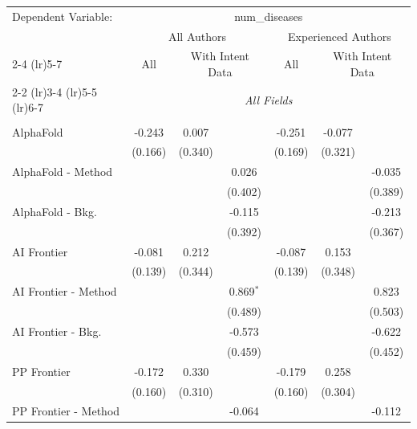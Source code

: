 \begingroup
\centering
\begin{tabular}{lcccccc}
   \tabularnewline \midrule \midrule
   Dependent Variable: & \multicolumn{6}{c}{num\_diseases}\\
 & \multicolumn{3}{c}{All Authors} & \multicolumn{3}{c}{Experienced Authors} \\
\cmidrule(lr){2-4} \cmidrule(lr){5-7}
 & \multicolumn{1}{c}{All} & \multicolumn{2}{c}{With Intent Data} & \multicolumn{1}{c}{All} & \multicolumn{2}{c}{With Intent Data} \\
\cmidrule(lr){2-2} \cmidrule(lr){3-4} \cmidrule(lr){5-5} \cmidrule(lr){6-7}
 & \multicolumn{6}{c}{\textit{All Fields}} \\ \\
   AlphaFold            & -0.243  & 0.007   &             & -0.251  & -0.077  &   \\   
                        & (0.166) & (0.340) &             & (0.169) & (0.321) &   \\   
   AlphaFold - Method   &         &         & 0.026       &         &         & -0.035\\   
                        &         &         & (0.402)     &         &         & (0.389)\\   
   AlphaFold - Bkg.     &         &         & -0.115      &         &         & -0.213\\   
                        &         &         & (0.392)     &         &         & (0.367)\\   
   AI Frontier          & -0.081  & 0.212   &             & -0.087  & 0.153   &   \\   
                        & (0.139) & (0.344) &             & (0.139) & (0.348) &   \\   
   AI Frontier - Method &         &         & 0.869$^{*}$ &         &         & 0.823\\   
                        &         &         & (0.489)     &         &         & (0.503)\\   
   AI Frontier - Bkg.   &         &         & -0.573      &         &         & -0.622\\   
                        &         &         & (0.459)     &         &         & (0.452)\\   
   PP Frontier          & -0.172  & 0.330   &             & -0.179  & 0.258   &   \\   
                        & (0.160) & (0.310) &             & (0.160) & (0.304) &   \\   
   PP Frontier - Method &         &         & -0.064      &         &         & -0.112\\   

\end{tabular}
